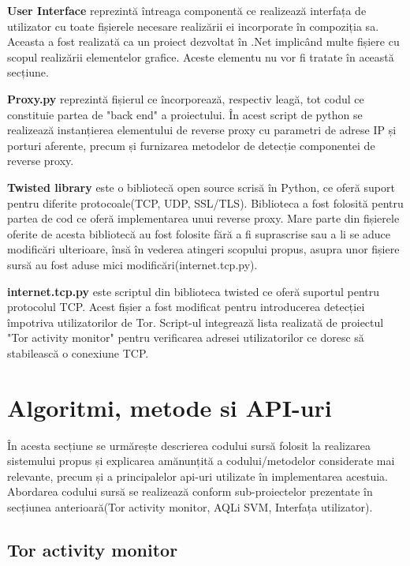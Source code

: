 \textbf{User Interface}  reprezintă întreaga componentă ce realizează interfața de utilizator cu toate fișierele necesare realizării ei incorporate în compoziția sa. Aceasta a fost realizată ca un proiect dezvoltat în .Net implicând multe fișiere cu scopul realizării elementelor grafice. Aceste elementu nu vor fi tratate în această secțiune. 

\textbf{Proxy.py}  reprezintă fișierul ce încorporează, respectiv leagă, tot codul ce constituie partea de "back end" a proiectului. În acest script de python se realizează instanțierea elementului de reverse proxy cu parametri de adrese IP și porturi aferente, precum și furnizarea metodelor de detecție componentei de reverse proxy. 

\textbf{Twisted library}  este o bibliotecă open source scrisă în Python, ce oferă suport pentru diferite protocoale(TCP, UDP, SSL/TLS). Biblioteca a fost folosită pentru partea de cod ce oferă implementarea unui reverse proxy. Mare parte din fișierele oferite de acesta bibliotecă au fost folosite fără a fi suprascrise sau a li se aduce modificări ulterioare, însă în vederea atingeri scopului propus, asupra unor fișiere sursă au fost aduse mici modificări(internet.tcp.py).

\textbf{internet.tcp.py} este scriptul din biblioteca twisted ce oferă suportul pentru protocolul TCP. Acest fișier a fost modificat pentru introducerea detecției împotriva utilizatorilor de Tor. Script-ul integrează lista realizată de proiectul "Tor activity monitor" pentru verificarea adresei utilizatorilor ce doresc să stabilească o conexiune TCP. 




\section{Algoritmi, metode si API-uri}

În acesta secțiune se urmărește descrierea codului sursă folosit la realizarea sistemului propus și explicarea amănunțită a codului/metodelor considerate mai relevante, precum și a principalelor api-uri utilizate în implementarea acestuia. Abordarea codului sursă se realizează conform sub-proiectelor prezentate în secțiunea anterioară(Tor activity monitor, AQLi SVM, Interfața utilizator). 

\subsection{Tor activity monitor}

